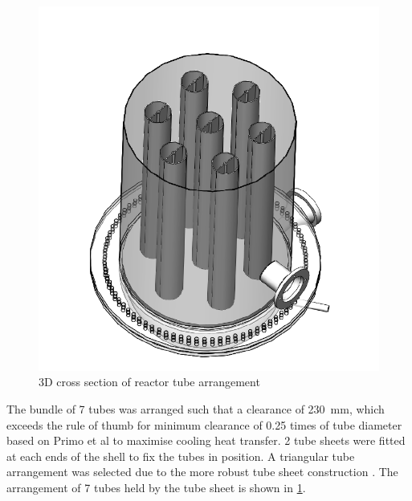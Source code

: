 \begin{figure}
    \centering
    \includegraphics[width=\linewidth]{chapters/2-reaction/figures/FYD reactor 7 tubes cross section 3D.PNG}
    \caption{3D cross section of reactor tube arrangement}
    \label{fig:reactortubearrangement}
\end{figure}
The bundle of 7 tubes was arranged such that a clearance of \SI{230}{\milli \metre}, which exceeds the rule of thumb for minimum clearance of 0.25 times of tube diameter based on Primo et al \cite{primo_shell_2012} to maximise cooling heat transfer. 2 tube sheets were fitted at each ends of the shell to fix the tubes in position. A triangular tube arrangement was selected due to the more robust tube sheet construction \cite{primo_shell_2012}.  The arrangement of 7 tubes held by the tube sheet is shown in \cref{fig:reactortubearrangement}.


